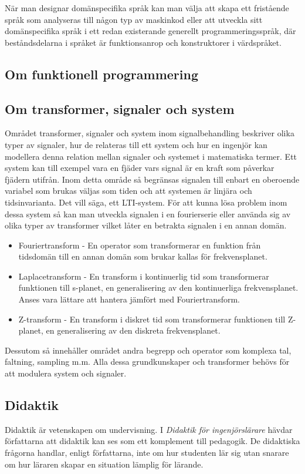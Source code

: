 \documentclass[]{article}
\begin{document}
När man designar domänspecifika språk kan man välja att skapa ett fristående
språk som analyseras till någon typ av maskinkod eller att utveckla sitt
domänspecifika språk i ett redan existerande generellt programmeringsspråk,
där beståndsdelarna i språket är funktionsanrop och konstruktorer i värdspråket.

\subsection{Om funktionell programmering}

\subsection{Om transformer, signaler och system}
Området transformer, signaler och system inom signalbehandling beskriver olika typer av signaler,
hur de relateras till ett system och hur en ingenjör kan modellera denna relation mellan signaler och systemet 
i matematiska termer. Ett system kan till exempel vara en fjäder vars signal är en kraft som påverkar fjädern utifrån. 
Inom detta område så begränsas signalen till enbart en oberoende variabel som brukas väljas 
som tiden och att systemen är linjära och tidsinvarianta. Det vill säga, ett LTI-system.
För att kunna lösa problem inom dessa system så kan man utveckla signalen i en fourierserie eller använda 
sig av olika typer av transformer vilket låter en betrakta signalen i en annan domän. 
\begin{itemize}
\item Fouriertransform - En operator som transformerar en funktion från tidsdomän till en annan domän som brukar kallas för frekvensplanet. 
\item Laplacetransform - En transform i kontinuerlig tid som transformerar funktionen till s-planet, en generalisering av den kontinuerliga frekvensplanet. Anses vara lättare att hantera jämfört med Fouriertransform.  
\item Z-transform - En transform i diskret tid som transformerar funktionen till Z-planet, en generalisering av den diskreta frekvensplanet.
\end{itemize}
Dessutom så innehåller området andra begrepp och operator som komplexa tal, faltning, sampling m.m. 
Alla dessa grundkunskaper och transformer behövs för att modulera system och signaler.


\subsection{Didaktik}
Didaktik är vetenskapen om undervisning.
I \textit{Didaktik för ingenjörslärare} hävdar författarna att
didaktik kan ses som ett komplement till pedagogik.
De didaktiska frågorna handlar, enligt författarna,
inte om hur studenten lär sig utan snarare om hur läraren skapar en
situation lämplig för lärande.
\end{document}
